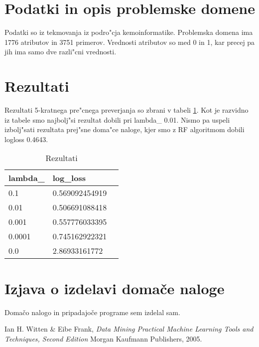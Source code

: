 \documentclass[a4paper,11pt]{article}
\begin{document}
\section{Podatki in opis problemske domene}

Podatki so iz tekmovanja iz podro"cja kemoinformatike. Problemska domena ima 1776 atributov in 3751 primerov. Vrednosti atributov so med 0 in 1, kar precej pa jih ima samo dve razli"cni vrednosti.

\section{Rezultati}
Rezultati 5-kratnega pre"cnega preverjanja so zbrani v tabeli \ref{pt}. Kot je razvidno iz tabele smo najbolj"si rezultat dobili pri lambda\_ 0.01. Nismo pa uspeli izbolj"sati rezultata prej"sne doma"ce naloge, kjer smo z RF algoritmom dobili logloss 0.4643. 
\begin{table}[htbp]
\caption{Rezultati}
\label{pt}
\begin{center}
\begin{tabular}{llp{3cm}}
lambda\_ &  log\_loss\\
\hline
0.1 & 0.569092454919\\
0.01 & 0.506691088418\\
0.001 & 0.557776033395\\
0.0001 & 0.745162922321\\
0.0 & 2.86933161772\\

\hline
\end{tabular}
\end{center}
\end{table}




\section{Izjava o izdelavi domače naloge}
Domačo nalogo in pripadajoče programe sem izdelal sam.


\begin{thebibliography}{9}

   Ian H. Witten \& Eibe Frank,
   \emph{Data Mining Practical Machine Learning Tools and Techniques, Second Edition}
   Morgan Kaufmann Publishers,  
   2005.

\end{thebibliography}
\end{document}
